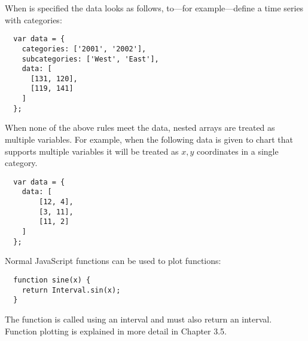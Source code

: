 When  is specified the data looks as follows, to---for example---define a time series with categories:
\begin{verbatim}
  var data = {
    categories: ['2001', '2002'],
    subcategories: ['West', 'East'],
    data: [
      [131, 120],
      [119, 141]
    ]
  };
\end{verbatim}

When none of the above rules meet the data, nested arrays are treated as multiple variables. For example, when the following data is given to chart that supports multiple variables it will be treated as $x, y$ coordinates in a single category.

\begin{verbatim}
  var data = {
    data: [
        [12, 4],
        [3, 11],
        [11, 2]
    ]
  };
\end{verbatim}

Normal JavaScript functions can be used to plot functions:

\begin{verbatim}
  function sine(x) {
    return Interval.sin(x);
  }
\end{verbatim}

The function is called using an interval and must also return an interval. Function plotting is explained in more detail in Chapter 3.5.
